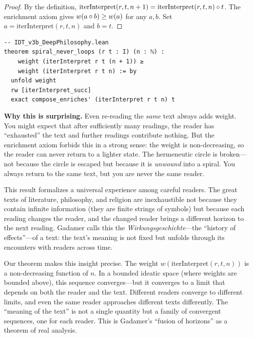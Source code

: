\begin{proof}
By the definition, $\mathrm{iterInterpret}(r, t, n+1) =
\mathrm{iterInterpret}(r, t, n) \circ t$. The enrichment axiom gives
$w(a \circ b) \geq w(a)$ for any $a, b$. Set
$a = \mathrm{iterInterpret}(r, t, n)$ and $b = t$.
\end{proof}

\begin{lstlisting}
-- IDT_v3b_DeepPhilosophy.lean
theorem spiral_never_loops (r t : I) (n : ℕ) :
    weight (iterInterpret r t (n + 1)) ≥
    weight (iterInterpret r t n) := by
  unfold weight
  rw [iterInterpret_succ]
  exact compose_enriches' (iterInterpret r t n) t
\end{lstlisting}

\begin{surprisebox}
\textbf{Why this is surprising.} Even re-reading the \emph{same} text
always adds weight. You might expect that after sufficiently many
readings, the reader has ``exhausted'' the text and further readings
contribute nothing. But the enrichment axiom forbids this in a strong
sense: the weight is non-decreasing, so the reader can never return to
a lighter state. The hermeneutic circle is broken---not because the
circle is escaped but because it is \emph{unwound} into a spiral. You
always return to the same text, but you are never the same reader.
\end{surprisebox}

This result formalizes a universal experience among careful readers. The
great texts of literature, philosophy, and religion are inexhaustible
not because they contain infinite information (they are finite strings
of symbols) but because each reading changes the reader, and the changed
reader brings a different horizon to the next reading. Gadamer calls
this the \emph{Wirkungsgeschichte}---the ``history of effects''---of a
text: the text's meaning is not fixed but unfolds through its
encounters with readers across time.

Our theorem makes this insight precise. The weight
$w(\mathrm{iterInterpret}(r, t, n))$ is a non-decreasing function of
$n$. In a bounded ideatic space (where weights are bounded above),
this sequence converges---but it converges to a limit that depends on
both the reader and the text. Different readers converge to different
limits, and even the same reader approaches different texts differently.
The ``meaning of the text'' is not a single quantity but a family of
convergent sequences, one for each reader. This is Gadamer's
``fusion of horizons'' as a theorem of real analysis.


